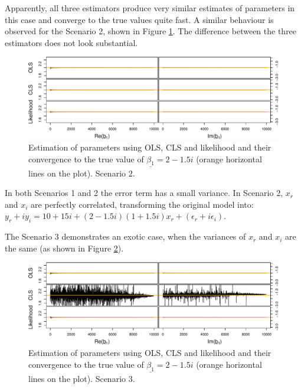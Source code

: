 \documentclass[
]{book}
\begin{document}
Apparently, all three estimators produce very similar estimates of parameters in this case and converge to the true values quite fast. A similar behaviour is observed for the Scenario 2, shown in Figure \ref{fig:parametersPC}. The difference between the three estimators does not look substantial.

\begin{figure}
\centering
\includegraphics{Svetunkov---Svetunkov---Complex-Valued-Econometrics_files/figure-latex/parametersPC-1.pdf}
\caption{\label{fig:parametersPC}Estimation of parameters using OLS, CLS and likelihood and their convergence to the true value of \(\underline{\beta_1}=2-1.5i\) (orange horizontal lines on the plot). Scenario 2.}
\end{figure}

In both Scenarios 1 and 2 the error term has a small variance. In Scenario 2, \(x_r\) and \(x_i\) are perfectly correlated, transforming the original model into: \(y_r + i y_i = 10+15i + (2-1.5i) (1 + 1.5 i) x_r + (\epsilon_r + i \epsilon_i)\).

The Scenario 3 demonstrates an exotic case, when the variances of \(x_r\) and \(x_i\) are the same (as shown in Figure \ref{fig:parametersUCSV}).

\begin{figure}
\centering
\includegraphics{Svetunkov---Svetunkov---Complex-Valued-Econometrics_files/figure-latex/parametersUCSV-1.pdf}
\caption{\label{fig:parametersUCSV}Estimation of parameters using OLS, CLS and likelihood and their convergence to the true value of \(\underline{\beta_1}=2-1.5i\) (orange horizontal lines on the plot). Scenario 3.}
\end{figure}
\end{document}
